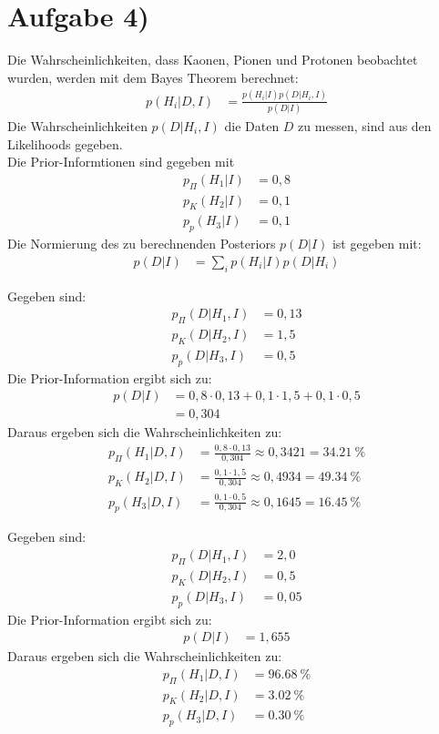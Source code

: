\newpage
\section*{Aufgabe 4)}
Die Wahrscheinlichkeiten, dass Kaonen, Pionen und Protonen beobachtet wurden, werden mit dem Bayes Theorem berechnet:
\begin{align*}
	p(H_i|D,I) &= \frac{p(H_i|I) p(D|H_i,I)}{p(D|I)}
\end{align*}
Die Wahrscheinlichkeiten $p(D|H_i,I)$ die Daten $D$ zu messen, sind aus den Likelihoods gegeben. \\
Die Prior-Informtionen sind gegeben mit
\begin{align*}
	p_\Pi(H_1|I) &= 0,8	\\
	p_K(H_2|I) &= 0,1	\\
	p_p(H_3|I) &= 0,1
\end{align*}
Die Normierung des zu berechnenden Posteriors $p(D|I)$ ist gegeben mit:
\begin{align*}
	p(D|I) &= \sum\limits_i p(H_i|I) p(D|H_i)
\end{align*}

Gegeben sind:
\begin{align*}
	p_\Pi(D|H_1,I) &= 0,13	\\
	p_K(D|H_2,I) &= 1,5	\\
	p_p(D|H_3,I) &= 0,5
\end{align*}
Die Prior-Information ergibt sich zu:
\begin{align*}
	p(D|I) &= 0,8 \cdot 0,13 + 0,1 \cdot 1,5  + 0,1 \cdot 0,5	\\
	&= 0,304
\end{align*}
Daraus ergeben sich die Wahrscheinlichkeiten zu:
\begin{align*}
	p_\Pi(H_1|D,I) &= \frac{0,8 \cdot 0,13}{0,304} \approx 0,3421 = \SI{34,21}{\percent}	\\
	p_K(H_2|D,I) &= \frac{0,1 \cdot 1,5}{0,304} \approx 0,4934 = \SI{49,34}{\percent}	\\
	p_p(H_3|D,I) &= \frac{0,1 \cdot 0,5}{0,304} \approx 0,1645 = \SI{16,45}{\percent}
\end{align*}

Gegeben sind:
\begin{align*}
	p_\Pi(D|H_1,I) &= 2,0	\\
	p_K(D|H_2,I) &= 0,5	\\
	p_p(D|H_3,I) &= 0,05
\end{align*}
Die Prior-Information ergibt sich zu:
\begin{align*}
	p(D|I) &= 1,655
\end{align*}
Daraus ergeben sich die Wahrscheinlichkeiten zu:
\begin{align*}
	p_\Pi(H_1|D,I) & = \SI{96,68}{\percent}	\\
	p_K(H_2|D,I) & =  \SI{3,02}{\percent}	\\
	p_p(H_3|D,I) &=  \SI{0,30}{\percent}
\end{align*}




